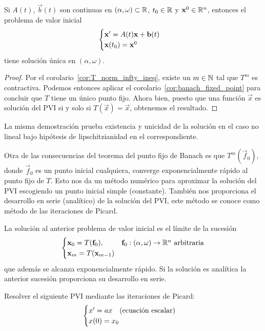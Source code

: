 \documentclass[../ecuaciones_diferenciales.tex]{subfiles}
\begin{document}
\begin{theorem}[Picard]
	Si \(A(t)\), \(\vec{b}(t)\) son continuas en
	\((\alpha, \omega) \subset \mathbb{R}\), \(t_0 \in \mathbb{R}\) y \(\mathbf{x}^0 \in \mathbb{R}^n\),
	entonces el problema de valor inicial
	\[\begin{cases}
		\mathbf{x}' = A(t)\mathbf{x} + \mathbf{b}(t) \\
		\mathbf{x}(t_0) = \mathbf{x}^0\end{cases}\]
	tiene solución única en \((\alpha, \omega)\).
\end{theorem}

\begin{proof}
	Por el corolario~\ref{cor:T_norm_infty_ineq}, existe un \(m \in \mathbb{N}\) tal que
    \(T^m\) es contractiva. Podemos entonces aplicar el
    corolario~\ref{cor:banach_fixed_point} para concluir que \(T\) tiene un
    único punto fijo. Ahora bien, puesto que una función \(\vec{x}\) es solución
    del PVI si y solo si \(T(\vec{x}) = \vec{x}\), obtenemos el resultado.
\end{proof}

\begin{remark}
	La misma demostración prueba existencia y unicidad de la solución en el caso
    no lineal bajo hipótesis de lipschitzianidad en el  correspondiente.
\end{remark}

Otra de las consecuencias del teorema del punto fijo de Banach es que
\(T^m(\vec{f}_0)\), donde \(\vec{f}_0\) es un punto inicial cualquiera, converge
exponencialmente rápido al punto fijo de \(T\). Esto nos da un método numérico
para aproximar la solución del PVI escogiendo un punto inicial simple
(constante). También nos proporciona el desarrollo en serie (analítico) de la
solución del PVI, este método se conoce como método de las iteraciones de
Picard.

\begin{corollary}\label{cor:picard_iter_lin}
	La solución al anterior problema de valor inicial es el límite de la
	sucesión
	\[\begin{cases}
		\mathbf{x}_0 = T(\mathbf{f}_0), & \mathbf{f}_0 : (\alpha, \omega) \to \mathbb{R}^n \text{ arbitraria}\\
		\mathbf{x}_m = T(\mathbf{x}_{m - 1})\end{cases}\]
  que además se alcanza exponencialmente rápido. Si la solución es analítica la
  anterior sucesión proporciona su desarrollo en serie.
\end{corollary}

\begin{example}
	Resolver el siguiente PVI mediante las iteraciones de Picard:
	\[\begin{cases}x' = ax \quad \text{(ecuación escalar)} \\
			x(0) = x_0\end{cases}\]
\end{example}
\end{document}
